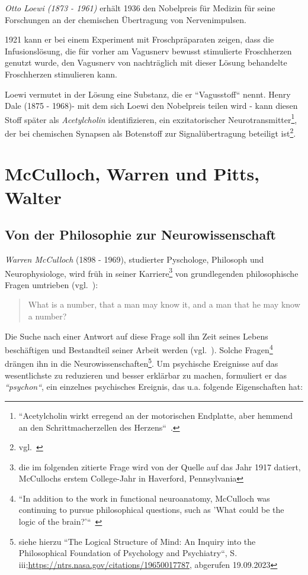 \textit{Otto Loewi (1873 - 1961)} erhält 1936 den Nobelpreis für Medizin für seine Forschungen an der chemischen Übertragung von Nervenimpulsen.

1921 kann er bei einem Experiment mit Froschpräparaten zeigen, dass die Infusionslösung, die für vorher am Vagusnerv bewusst stimulierte Froschherzen genutzt wurde, den Vagusnerv von nachträglich mit dieser Lösung behandelte Froschherzen stimulieren kann.

Loewi vermutet in der Lösung eine Substanz, die er ``Vagusstoff`` nennt.
Henry Dale (1875 - 1968)- mit dem sich Loewi den Nobelpreis teilen wird - kann diesen Stoff später als \textit{Acetylcholin} identifizieren, ein exzitatorischer Neurotransmitter\footnote{
    ``Acetylcholin wirkt erregend an der motorischen Endplatte, aber hemmend an den Schrittmacherzellen des Herzens``~\cite[105]{HS19b}.
}, der bei chemischen Synapsen als Botenstoff zur Signalübertragung beteiligt ist\footnote{
    vgl.~\cite[119, Exkurs 5.1]{BCP18}
}.



\section{McCulloch, Warren und Pitts, Walter}\label{appendix:mcculloch}
\subsection*{Von der Philosophie zur Neurowissenschaft}

\textit{Warren McCulloch} (1898 - 1969), studierter Pyschologe, Philosoph und Neurophysiologe, wird früh in seiner Karriere\footnote{
    die im folgenden zitierte Frage wird von der Quelle auf das Jahr 1917 datiert, McCullochs erstem College-Jahr in Haverford, Pennsylvania
} von grundlegenden philosophische Fragen umtrieben (vgl.~\cite[1]{Arb19}):

\blockquote[{\cite[2]{Mcc16}}]{
    What is a number, that a man may know it, and a man that he may know a number{?}
}

\noindent
Die Suche nach einer Antwort auf diese Frage soll ihn Zeit seines Lebens beschäftigen und Bestandteil seiner Arbeit werden (vgl.~\cite[4 f.]{Abr02}).
Solche Fragen\footnote{
    ``In addition to the work in functional neuroanatomy, McCulloch was continuing to pursue philosophical questions, such as 'What could be the logic of the brain?'``~\cite[3]{Arb19}
} drängen ihn in die Neurowissenschaften\footnote{
siehe hierzu ``The Logical Structure of Mind: An Inquiry into the Philosophical Foundation of Psychology and Psychiatry``, S. iii;\url{https://ntrs.nasa.gov/citations/19650017787}, abgerufen 19.09.2023
}.
Um psychische Ereignisse auf das wesentlichste zu reduzieren und besser erklärbar zu machen, formuliert er das \textit{``psychon``}, ein einzelnes psychisches Ereignis, das u.a. folgende Eigenschaften hat:

